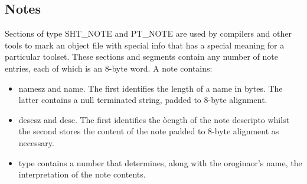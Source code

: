 \documentclass[paper=a4, fontsize=11pt]{report} %
\numberwithin{equation}{section} %
\numberwithin{figure}{section} %
\numberwithin{table}{section} %
\begin{document}
\subsection{Notes}
Sections of type {\ttfamily SHT\_NOTE} and {\ttfamily PT\_NOTE} are used by 
compilers and other tools to mark an object file with special info that has a 
special meaning for a particular toolset. These sections and segments contain 
any number of note entries, each of which is an 8-byte word. A note contains:
\begin{itemize}
	\item {\ttfamily namesz} and {\ttfamily name}. The first identifies the 
	length of a name in bytes. The latter contains a null terminated string, 
	padded to 8-byte alignment.
	\item {\ttfamily descsz} and {\ttfamily desc}. The first identifies the 
	òength of the note descripto whilst the second stores the content of the 
	note padded to 8-byte alignment as necessary.
	\item {\ttfamily type} contains a number that determines, along with the 
	oroginaor's name, the interpretation of the note contents.
\end{itemize}
\end{document}
